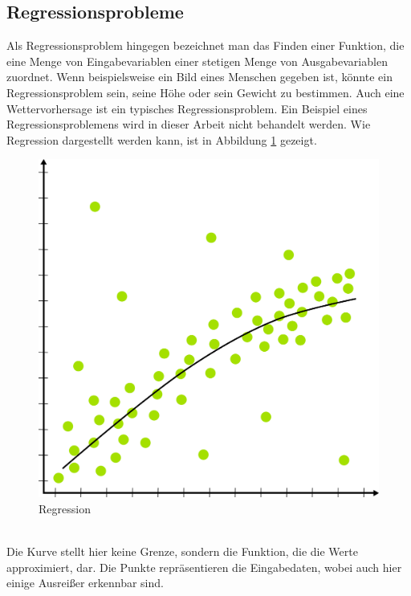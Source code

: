 \documentclass[11pt]{article}
\begin{document}
\subsection{Regressionsprobleme}
Als Regressionsproblem hingegen bezeichnet man das Finden einer Funktion, die eine Menge von Eingabevariablen einer stetigen Menge von Ausgabevariablen zuordnet. Wenn beispielsweise ein Bild eines Menschen gegeben ist, könnte ein Regressionsproblem sein, seine Höhe oder sein Gewicht zu bestimmen. Auch eine Wettervorhersage ist ein typisches Regressionsproblem. Ein Beispiel eines Regressionsproblemens wird in dieser Arbeit nicht behandelt werden. Wie Regression dargestellt werden kann, ist in Abbildung \ref{Regression} gezeigt.
\begin{figure}[h]
	\centering
	\includegraphics[width=0.4\linewidth]{../graphics/Regression.png}
	\caption{Regression}
	\label{Regression}
\end{figure}
\\
Die Kurve stellt hier keine Grenze, sondern die Funktion, die die Werte approximiert, dar. Die Punkte repräsentieren die Eingabedaten, wobei auch hier einige Ausreißer erkennbar sind.
\end{document}
